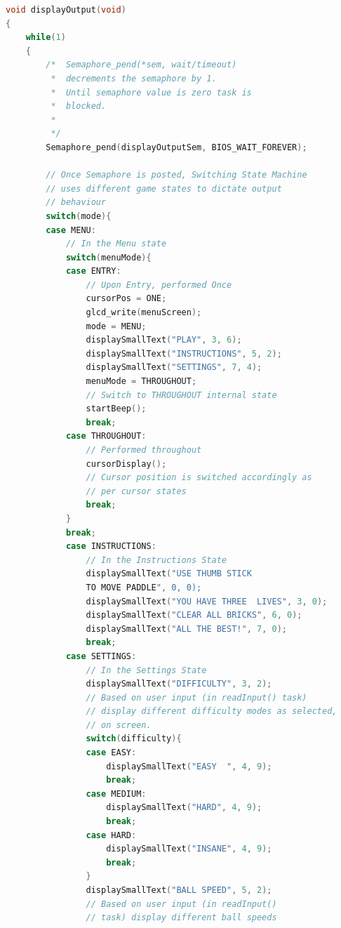 \documentclass{article}
\begin{document}
\begin{lstlisting}[basicstyle = \small, language = C]
void displayOutput(void)
{
    while(1)
    {
        /*  Semaphore_pend(*sem, wait/timeout) 
         *  decrements the semaphore by 1.
         *  Until semaphore value is zero task is 
         *  blocked.
         *
         */
        Semaphore_pend(displayOutputSem, BIOS_WAIT_FOREVER);

        // Once Semaphore is posted, Switching State Machine 
        // uses different game states to dictate output 
        // behaviour
        switch(mode){
        case MENU:
            // In the Menu state
            switch(menuMode){
            case ENTRY:
                // Upon Entry, performed Once
                cursorPos = ONE;
                glcd_write(menuScreen);
                mode = MENU;
                displaySmallText("PLAY", 3, 6);
                displaySmallText("INSTRUCTIONS", 5, 2);
                displaySmallText("SETTINGS", 7, 4);
                menuMode = THROUGHOUT; 
                // Switch to THROUGHOUT internal state
                startBeep();
                break;
            case THROUGHOUT:
                // Performed throughout
                cursorDisplay(); 
                // Cursor position is switched accordingly as 
                // per cursor states
                break;
            }
            break;
            case INSTRUCTIONS:
                // In the Instructions State
                displaySmallText("USE THUMB STICK 
                TO MOVE PADDLE", 0, 0);
                displaySmallText("YOU HAVE THREE  LIVES", 3, 0);
                displaySmallText("CLEAR ALL BRICKS", 6, 0);
                displaySmallText("ALL THE BEST!", 7, 0);
                break;
            case SETTINGS:
                // In the Settings State
                displaySmallText("DIFFICULTY", 3, 2);
                // Based on user input (in readInput() task) 
                // display different difficulty modes as selected, 
                // on screen.
                switch(difficulty){
                case EASY:
                    displaySmallText("EASY  ", 4, 9);
                    break;
                case MEDIUM:
                    displaySmallText("HARD", 4, 9);
                    break;
                case HARD:
                    displaySmallText("INSANE", 4, 9);
                    break;
                }
                displaySmallText("BALL SPEED", 5, 2);
                // Based on user input (in readInput() 
                // task) display different ball speeds 

\end{lstlisting}
\end{document}
